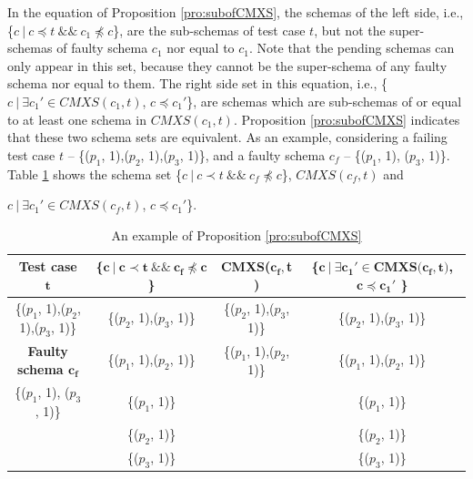 \documentclass{sig-alternate-05-2015}
\begin{document}
In the equation of Proposition \ref{pro:subofCMXS}, the schemas of the left side, i.e., \{$c\ |\ c \preceq t\ \&\&\ c_{1} \npreceq c$\}, are the sub-schemas of test case $t$, but not the super-schemas of faulty schema $c_{1}$ nor equal to $c_{1}$.  Note that the pending schemas can only appear in this set, because they cannot be the super-schema of any faulty schema nor equal to them. The right side set in this equation, i.e., \{$ c\ |\ \exists c_{1}' \in CMXS(c_{1}, t)$, $c \preceq c_{1}'$\}, are schemas which are sub-schemas of or equal to at least one schema in $CMXS(c_{1}, t)$. Proposition \ref{pro:subofCMXS} indicates that these two schema sets are equivalent. As an example, considering a failing test case $t$ -- \{($p_{1}$, 1),($p_{2}$, 1),($p_{3}$, 1)\}, and a faulty schema $c_{f}$ --  \{($p_{1}$, 1), ($p_{3}$, 1)\}. Table \ref{examleOfCMXSPro} shows the schema set  \{$c\ |\ c \prec t\ \&\&\ c_{f} \npreceq c$\}, $CMXS(c_{f}, t)$ and {$ c\ |\ \exists c_{1}' \in CMXS(c_{f}, t)$, $c \preceq c_{1}'$\}.

\begin{table}[ht]
  \centering
  \setlength{\tabcolsep}{3pt}
  \caption{An example of Proposition \ref{pro:subofCMXS}}
    \begin{tabular}{|c|c|c|c|}
    \hline
  \textbf{  Test case $\textbf{t}$} & \textbf{ \{$\textbf{c}\ |\ \textbf{c} \prec \textbf{t}\ \&\&\ \textbf{c}_{\textbf{f}} \npreceq \textbf{c}$\} }& \textbf{ CMXS($\textbf{c}_{\textbf{f}}, $\textbf{t}$ $)} & \textbf{\{$ \textbf{c}\ |\ \exists \textbf{c}_{\textbf{1}}' \in \textbf{CMXS}\textbf{(}\textbf{c}_{\textbf{f}}, \textbf{t}\textbf{)}$, $\textbf{c} \preceq \textbf{c}_{\textbf{1}}'$ \}}\\\hline
    \{($p_{1}$, 1),($p_{2}$, 1),($p_{3}$, 1)\}  & \{($p_{2}$, 1),($p_{3}$, 1)\} & \{($p_{2}$, 1),($p_{3}$, 1)\} & \{($p_{2}$, 1),($p_{3}$, 1)\}\\ \cline{1-1}
      \textbf{Faulty schema $\textbf{c}_{\textbf{f}}$}  & \{($p_{1}$, 1),($p_{2}$, 1)\} & \{($p_{1}$, 1),($p_{2}$, 1)\} & \{($p_{1}$, 1),($p_{2}$, 1)\} \\\cline{1-1}
     \{($p_{1}$, 1), ($p_{3}$, 1)\}         & \{($p_{1}$, 1)\} &  &\{($p_{1}$, 1)\}\\
          &       \{($p_{2}$, 1)\} &  &\{($p_{2}$, 1)\}\\
          &       \{($p_{3}$, 1)\} &  & \{($p_{3}$, 1)\}\\\hline
    \end{tabular}%
  \label{examleOfCMXSPro}%
\end{table}%

}
\end{document}
